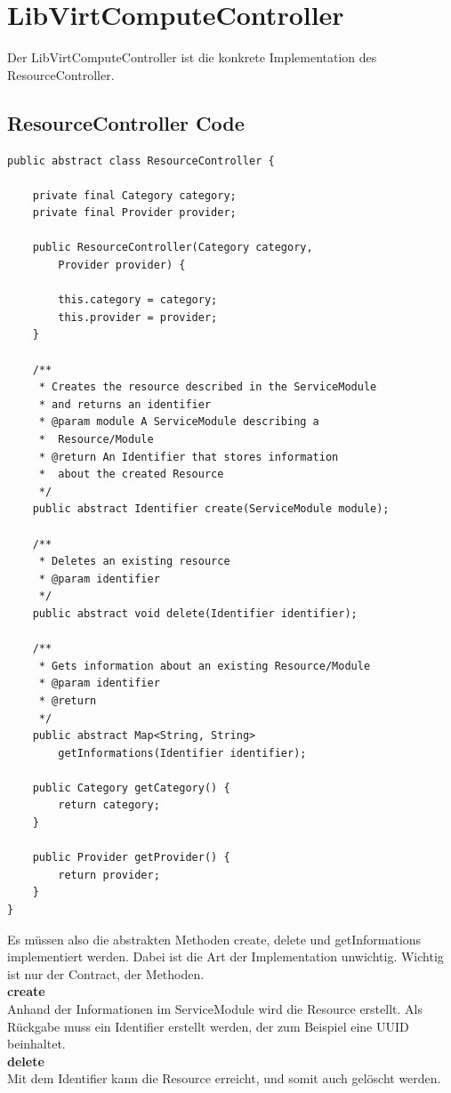 \documentclass[11pt]{scrartcl}
\begin{document}
\newpage
\section{LibVirtComputeController}
Der LibVirtComputeController ist die konkrete Implementation des ResourceController.

\subsection{ResourceController Code}
\begin{lstlisting}[frame=single] 
public abstract class ResourceController {
	
	private final Category category;
	private final Provider provider;
	
	public ResourceController(Category category, 
		Provider provider) {
		
		this.category = category;
		this.provider = provider;
	}
	
	/**
	 * Creates the resource described in the ServiceModule
	 * and returns an identifier
	 * @param module A ServiceModule describing a 
	 *	Resource/Module
	 * @return An Identifier that stores information 
	 *	about the created Resource
	 */
	public abstract Identifier create(ServiceModule module);
	
	/**
	 * Deletes an existing resource
	 * @param identifier 
	 */
	public abstract void delete(Identifier identifier);
	
	/**
	 * Gets information about an existing Resource/Module
	 * @param identifier
	 * @return 
	 */
	public abstract Map<String, String> 
		getInformations(Identifier identifier);
	
	public Category getCategory() {
		return category;
	}
	
	public Provider getProvider() {
		return provider;
	}
}
\end{lstlisting}

Es müssen also die abstrakten Methoden create, delete und getInformations implementiert werden. Dabei ist die Art der Implementation unwichtig. Wichtig ist nur der Contract, der Methoden.\\

\textbf{create}\\
Anhand der Informationen im ServiceModule wird die Resource erstellt. Als Rückgabe muss ein Identifier erstellt werden, der zum Beispiel eine UUID beinhaltet.\\

\textbf{delete}\\
Mit dem Identifier kann die Resource erreicht, und somit auch gelöscht werden.\\
\end{document}
